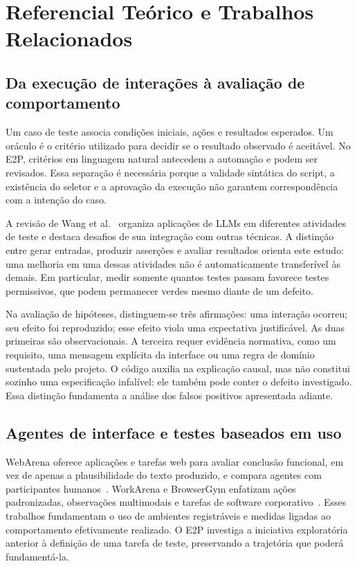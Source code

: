 \documentclass[12pt]{article}
\begin{document}
\section{Referencial Teórico e Trabalhos Relacionados}\label{sec:related}
\subsection{Da execução de interações à avaliação de comportamento}
Um caso de teste associa condições iniciais, ações e resultados esperados. Um oráculo é o critério utilizado para decidir se o resultado observado é aceitável. No E2P, critérios em linguagem natural antecedem a automação e podem ser revisados. Essa separação é necessária porque a validade sintática do script, a existência do seletor e a aprovação da execução não garantem correspondência com a intenção do caso.

A revisão de Wang et al.~\cite{wang2024survey} organiza aplicações de LLMs em diferentes atividades de teste e destaca desafios de sua integração com outras técnicas. A distinção entre gerar entradas, produzir asserções e avaliar resultados orienta este estudo: uma melhoria em uma dessas atividades não é automaticamente transferível às demais. Em particular, medir somente quantos testes passam favorece testes permissivos, que podem permanecer verdes mesmo diante de um defeito.

Na avaliação de hipóteses, distinguem-se três afirmações: uma interação ocorreu; seu efeito foi reproduzido; esse efeito viola uma expectativa justificável. As duas primeiras são observacionais. A terceira requer evidência normativa, como um requisito, uma mensagem explícita da interface ou uma regra de domínio sustentada pelo projeto. O código auxilia na explicação causal, mas não constitui sozinho uma especificação infalível: ele também pode conter o defeito investigado. Essa distinção fundamenta a análise dos falsos positivos apresentada adiante.

\subsection{Agentes de interface e testes baseados em uso}
WebArena oferece aplicações e tarefas web para avaliar conclusão funcional, em vez de apenas a plausibilidade do texto produzido, e compara agentes com participantes humanos~\cite{zhou2024webarena}. WorkArena e BrowserGym enfatizam ações padronizadas, observações multimodais e tarefas de software corporativo~\cite{drouin2024workarena}. Esses trabalhos fundamentam o uso de ambientes registráveis e medidas ligadas ao comportamento efetivamente realizado. O E2P investiga a iniciativa exploratória anterior à definição de uma tarefa de teste, preservando a trajetória que poderá fundamentá-la.
\end{document}
